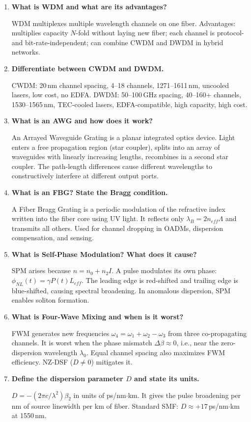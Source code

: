 \documentclass[12pt,a4paper]{article}
\newcommand{\Q}[1]{\textbf{#1}\par\noindent\ignorespaces}
\begin{document}
\begin{tcolorbox}[exambox, title={\textbf{Frequently Asked / Viva Questions}}]
\begin{enumerate}[topsep=0pt, label=\textbf{Q\arabic*.}, itemsep=5pt]
  \item \Q{What is WDM and what are its advantages?}
    WDM multiplexes multiple wavelength channels on one fiber. Advantages: multiplies capacity $N$-fold without laying new fiber; each channel is protocol- and bit-rate-independent; can combine CWDM and DWDM in hybrid networks.
  \item \Q{Differentiate between CWDM and DWDM.}
    CWDM: 20\,nm channel spacing, 4--18 channels, 1271--1611\,nm, uncooled lasers, low cost, no EDFA. DWDM: 50--100\,GHz spacing, 40--160+ channels, 1530--1565\,nm, TEC-cooled lasers, EDFA-compatible, high capacity, high cost.
  \item \Q{What is an AWG and how does it work?}
    An Arrayed Waveguide Grating is a planar integrated optics device. Light enters a free propagation region (star coupler), splits into an array of waveguides with linearly increasing lengths, recombines in a second star coupler. The path-length differences cause different wavelengths to constructively interfere at different output ports.
  \item \Q{What is an FBG? State the Bragg condition.}
    A Fiber Bragg Grating is a periodic modulation of the refractive index written into the fiber core using UV light. It reflects only $\lambda_B = 2n_{eff}\Lambda$ and transmits all others. Used for channel dropping in OADMs, dispersion compensation, and sensing.
  \item \Q{What is Self-Phase Modulation? What does it cause?}
    SPM arises because $n = n_0 + n_2 I$. A pulse modulates its own phase: $\phi_{NL}(t) = \gamma P(t) L_{eff}$. The leading edge is red-shifted and trailing edge is blue-shifted, causing spectral broadening. In anomalous dispersion, SPM enables soliton formation.
  \item \Q{What is Four-Wave Mixing and when is it worst?}
    FWM generates new frequencies $\omega_4 = \omega_1 + \omega_2 - \omega_3$ from three co-propagating channels. It is worst when the phase mismatch $\Delta\beta \approx 0$, i.e., near the zero-dispersion wavelength $\lambda_0$. Equal channel spacing also maximizes FWM efficiency. NZ-DSF ($D \neq 0$) mitigates it.
  \item \Q{Define the dispersion parameter $D$ and state its units.}
    $D = -(2\pi c/\lambda^2)\beta_2$ in units of ps/nm$\cdot$km. It gives the pulse broadening per nm of source linewidth per km of fiber. Standard SMF: $D \approx +17$\,ps/nm$\cdot$km at 1550\,nm.

\end{enumerate}
\end{tcolorbox}
\end{document}
